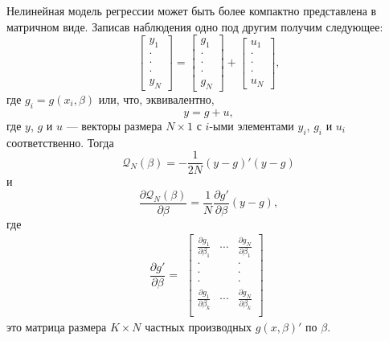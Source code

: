 Нелинейная модель регрессии может быть более компактно представлена в матричном виде. Записав наблюдения одно под другим получим следующее:
\begin{equation}
\begin{bmatrix} y_1 \\ \cdot \\ \cdot \\ \cdot \\ y_N \end{bmatrix} = \begin{bmatrix} g_1 \\ \cdot \\ \cdot \\ \cdot \\ g_N \end{bmatrix} + \begin{bmatrix} u_1 \\ \cdot \\ \cdot \\ \cdot \\ u_N \end{bmatrix},
\end{equation}
где $g_i=g(x_i,\beta)$ или, что, эквивалентно,
\begin{equation}
y=g+u,
\end{equation}
где $y$, $g$ и $u$ --- векторы размера $N \times 1$ с $i$-ыми элементами $y_i$, $g_i$ и $u_i$ соответственно.
Тогда
\[
\mathcal{Q}_{N}(\beta)=- \frac{1}{2N} (y-g)'(y-g)
\]
и
\begin{equation}
\frac {\partial \mathcal{Q}_{N}(\beta)} {\partial \beta}= \frac{1}{N} \frac{\partial g'}{\partial \beta}(y-g),
\end{equation}
где
\begin{equation}
\frac{\partial g'}{\partial \beta}= \begin{matrix} \begin{bmatrix} 
\frac{\partial g_1}{\partial \beta_1} & \cdots & \frac{\partial g_N}{\partial \beta_1}\\
\cdot &  & \cdot \\
\cdot &  & \cdot \\
\cdot &  & \cdot \\
\frac{\partial g_1}{\partial \beta_k} & \cdots & \frac{\partial g_N}{\partial \beta_k}\\
\end{bmatrix} \end{matrix}
\end{equation}
это матрица размера $K \times N$ частных производных $g(x,\beta)'$ по $\beta$.

